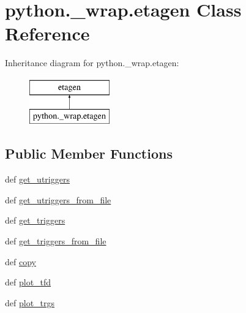 \hypertarget{classpython_1_1__wrap_1_1etagen}{\section{python.\-\_\-wrap.\-etagen Class Reference}
\label{classpython_1_1__wrap_1_1etagen}
}
Inheritance diagram for python.\-\_\-wrap.\-etagen\-:\begin{figure}[H]
\begin{center}
\leavevmode
\includegraphics[height=2.000000cm]{classpython_1_1__wrap_1_1etagen}
\end{center}
\end{figure}
\subsection*{Public Member Functions}
\begin{DoxyCompactItemize}
\item 
def \hyperlink{classpython_1_1__wrap_1_1etagen_a27945aeb4059ba3b81e38fff12ea5424}{get\-\_\-utriggers}
\item 
def \hyperlink{classpython_1_1__wrap_1_1etagen_a73614979353f43ac4bfc923bce68d2cd}{get\-\_\-utriggers\-\_\-from\-\_\-file}
\item 
def \hyperlink{classpython_1_1__wrap_1_1etagen_a6f332e2242c9bb8b87dc593f17542873}{get\-\_\-triggers}
\item 
def \hyperlink{classpython_1_1__wrap_1_1etagen_add5689086be59da228ee79535f19aa8a}{get\-\_\-triggers\-\_\-from\-\_\-file}
\item 
def \hyperlink{classpython_1_1__wrap_1_1etagen_adba206932fb4791a553a36d147c43bd8}{copy}
\item 
def \hyperlink{classpython_1_1__wrap_1_1etagen_a5393c44d9e6a8754dda3a3835f66cebb}{plot\-\_\-tfd}
\item 
def \hyperlink{classpython_1_1__wrap_1_1etagen_aa8188f4111faefd7df20a40e7a233afd}{plot\-\_\-trgs}
\end{DoxyCompactItemize}
